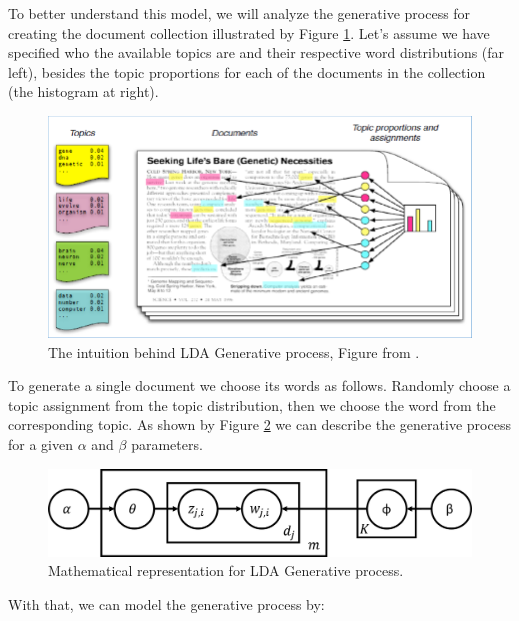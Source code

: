 	To better understand this model, we will analyze the generative process for creating the document collection illustrated by Figure \ref{fig:lda-generative-process}. Let's assume we have specified who the available topics are and their respective word distributions (far left), besides the topic proportions for each of the documents in the collection (the histogram at right). 
		
	\begin{figure}[h!]
		\centering
		\includegraphics[width=\linewidth]{01.Chapters/02.Background/The-intuition-behind-LDA-Generative-process-by-D-Blei-17}
		\caption{The intuition behind LDA Generative process, Figure from  \cite{blei2012probabilistic}.}
		\label{fig:lda-generative-process}
	\end{figure}
	
	\newpage
	To generate a single document we choose its words as follows. Randomly choose a topic assignment from the topic distribution, then we choose the word from the corresponding topic. As shown by Figure \ref{fig:generative-probs} we can describe the generative process for a given $\alpha$ and $\beta$ parameters.
	
	\begin{figure}[h!]
		\centering
		\includegraphics[width=0.7\linewidth]{01.Chapters/02.Background/generative-probs}
		\caption{Mathematical representation for LDA Generative process.}
		\label{fig:generative-probs}
	\end{figure}
	
	With that, we can model the generative process by: 
	
